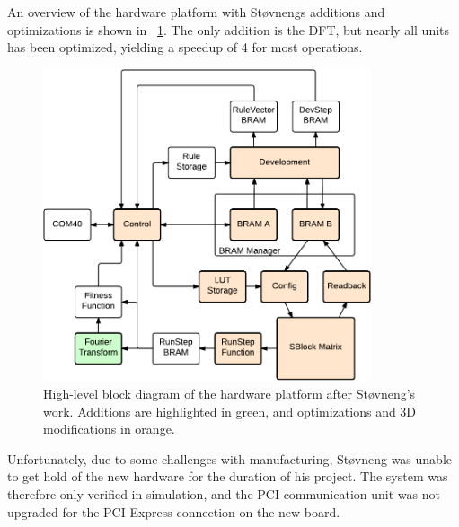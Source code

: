 An overview of the hardware platform with Støvnengs additions and optimizations is shown in \figurename~\ref{fig:overview-stovneng}.
The only addition is the DFT, but nearly all units has been optimized, yielding a speedup of 4 for most operations.

\begin{figure}[!ht]
    \centering
    \includegraphics[width=0.86\textwidth]{figures/overview-stovneng}
    \caption[Støvneng's hardware design.]{
        High-level block diagram of the hardware platform after Støvneng's work.
        Additions are highlighted in green, and optimizations and 3D modifications in orange.
    }
    \label{fig:overview-stovneng}
\end{figure}

Unfortunately, due to some challenges with manufacturing, Støvneng was unable to get hold of the new hardware for the duration of his project.
The system was therefore only verified in simulation, and the PCI communication unit was not upgraded for the PCI Express connection on the new board.
